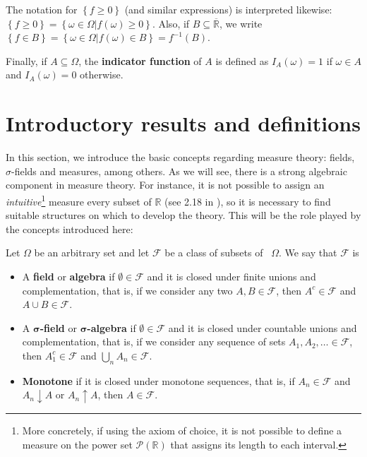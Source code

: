 The notation for \(\left\{f\geq 0\right\}\) (and similar expressions) is interpreted likewise:
\(\left\{f\geq 0\right\}=\left\{\omega\in\Omega\left|f(\omega)\geq 0\right.\right\}\). Also, if \(B\subseteq\overline{\mathbb{R}}\), we write \(\left\{f\in B\right\}=\left\{\omega\in\Omega\left|f(\omega)\in B\right.\right\}=f^{-1}(B)\).
	
Finally, if \(A\subseteq\Omega\), the \textbf{indicator function} of \(A\) is defined
as \(I_A(\omega)=1\) if \(\omega\in A\) and \(I_A(\omega)=0\) otherwise.


\section{Introductory results and definitions}\label{section:introductory results and definitions}
	
In this section, we introduce the basic concepts regarding measure theory:
fields, \(\sigma\)-fields and measures, among others. As we will see, there is a strong algebraic component in measure theory. For instance, it is not possible
to assign an \emph{intuitive}\footnote{More concretely, if using the axiom of choice, it is not possible to define a measure on the power set \(\mathcal{P}(\mathbb{R})\) that assigns its length to each interval.} measure every subset of \(\mathbb{R}\) (see 2.18 in \cite{axler}), so it is necessary to find 
suitable structures on which to develop the theory. This will be the role played
by the concepts introduced here:
	
\begin{defn}
Let \(\Omega\) be an arbitrary set and let \(\mathcal{F}\) be a class of subsets of ~\(\Omega\). We say that \(\mathcal{F}\) is
\begin{itemize}
		\item A \textbf{field} or \textbf{algebra} if \(\emptyset\in\mathcal{F}\) and
				it is closed under finite unions and complementation, that is, if we consider any two 
				\(A,B\in\mathcal{F}\), then \(A^c\in\mathcal{F}\) and \(A\cup B\in\mathcal{F}\).
		\item 
				A \(\bm{\sigma}\)\textbf{-field} or \(\bm{\sigma}\)\textbf{-algebra} if
				\(\emptyset\in\mathcal{F}\) and it is closed under countable unions and complementation,
				that is, if we consider any sequence of sets \(A_1,A_{2},\dots\in\mathcal{F}\), then 
				\(A_1^c\in\mathcal{F}\) and \(\bigcup_nA_n\in\mathcal{F}\).
		\item \textbf{Monotone} if it is closed under monotone sequences, that is, if 
				\(A_n\in\mathcal{F}\) and \(A_n\downarrow A\) or \(A_n\uparrow A\), then
				\(A\in\mathcal{F}\).
\end{itemize}
\end{defn}

